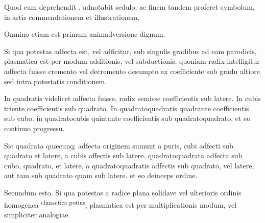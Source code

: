 \documentclass[11pt,a4paper]{article}
\begin{document}

Quod cum deprehendit , adnotabit sedulo, ac finem tandem proferet symbolum, in artis commendationem et illustrationem.

Omnino etiam est primum animadversione dignum.

Si qua potestas adfecta est, vel adficitur, sub singulis gradibus ad eam parodicis, plasmatica est per modum additionis, vel subductionis, quoniam radix intelligitur adfecta fuisse cremento vel decremento desumpto ex coefficiente sub gradu altiore sed intra potestatis conditionem.

In quadratis videlicet adfecta fuisse, radix semisse coefficientis sub latere. In cubis triente coefficientis sub quadrato. In quadratoquadratis quadrante coefficientis sub cubo. in quadratocubis quintante coefficientis sub quadratoquadrato, et eo continuo progressu.

Sic quadrata quæcunq; adfecta originem sumunt a puris, cubi adfecti sub quadrato et latere, a cubis affectis sub latere. quadratoquadrata adfecta sub cubo, quadrato, et latere, a quadratoquadratis adfectis sub quadrato, vel latere, aut tam sub quadrato quam sub latere. et eo deinceps ordine.

Secundum esto. Si qua potestas a radice plana\struck{\ill{}} solidave vel ulterioris ordinis homogenea \textsuperscript{climactica potius}, plasmatica est per multiplicationis modum, vel simpliciter analogiae.
\end{document}
